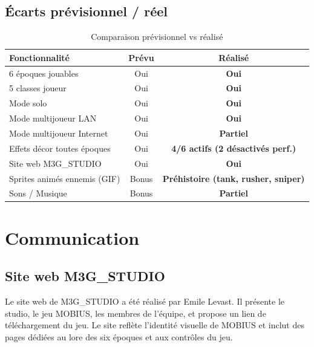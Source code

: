 \documentclass[12pt,a4paper]{article}
\begin{document}
\subsection{Écarts prévisionnel / réel}

\begin{table}[H]
\centering
\caption{Comparaison prévisionnel vs réalisé}
\renewcommand{\arraystretch}{1.4}
\begin{tabularx}{\textwidth}{@{}Xcc@{}}
\toprule
\rowcolor{tableheadbg}
\textbf{Fonctionnalité} & \textbf{Prévu} & \textbf{Réalisé} \\
\midrule
6 époques jouables            & Oui   & \textcolor{okgreen}{\textbf{Oui}} \\
\rowcolor{rowaltbg}
5 classes joueur              & Oui   & \textcolor{okgreen}{\textbf{Oui}} \\
Mode solo                     & Oui   & \textcolor{okgreen}{\textbf{Oui}} \\
\rowcolor{rowaltbg}
Mode multijoueur LAN          & Oui   & \textcolor{okgreen}{\textbf{Oui}} \\
Mode multijoueur Internet     & Oui   & \textcolor{warnorange}{\textbf{Partiel}} \\
\rowcolor{rowaltbg}
Effets décor toutes époques   & Oui   & \textcolor{warnorange}{\textbf{4/6 actifs (2 désactivés perf.)}} \\
Site web M3G\_STUDIO          & Oui   & \textcolor{okgreen}{\textbf{Oui}} \\
\rowcolor{rowaltbg}
Sprites animés ennemis (GIF)  & Bonus & \textcolor{okgreen}{\textbf{Préhistoire (tank, rusher, sniper)}} \\
Sons / Musique                & Bonus & \textcolor{warnorange}{\textbf{Partiel}} \\
\bottomrule
\end{tabularx}
\end{table}

\newpage
\section{Communication}

\subsection{Site web M3G\_STUDIO}

Le site web de M3G\_STUDIO a été réalisé par Emile Levast. Il présente le studio, le jeu MOBIUS, les membres de l'équipe, et propose un lien de téléchargement du jeu. Le site reflète l'identité visuelle de MOBIUS et inclut des pages dédiées au lore des six époques et aux contrôles du jeu.
\end{document}
